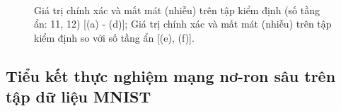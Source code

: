 \begin{figure}[ht!]
\begin{center}
{        }\\
%
    \end{center}
    \caption{%
        Giá trị chính xác và mất mát (nhiễu) trên tập kiểm định (số tầng ẩn: 11, 12) [(a) - (d)]; Giá trị chính xác và mất mát (nhiễu) trên tập kiểm định so với số tầng ẩn [(e), (f)].
     }%
  \label{fig:wowinoise4}
\end{figure}

\clearpage

\subsection{Tiểu kết thực nghiệm mạng nơ-ron sâu trên tập dữ liệu MNIST}\label{subsec:tieuketdepthmnist}

